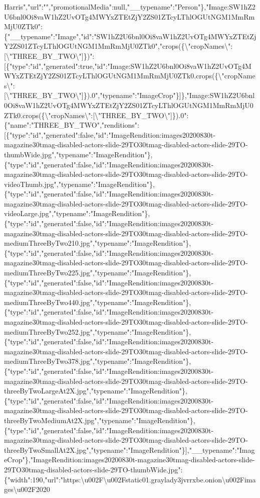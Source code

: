 Harris","url":"","promotionalMedia":null,"\_\_typename":"Person"\},"Image:SW1hZ2U6bnl0Oi8vaW1hZ2UvOTg4MWYxZTEtZjY2ZS01ZTcyLThlOGUtNGM1MmRmMjU0ZTk0":\{"\_\_typename":"Image","id":"SW1hZ2U6bnl0Oi8vaW1hZ2UvOTg4MWYxZTEtZjY2ZS01ZTcyLThlOGUtNGM1MmRmMjU0ZTk0","crops(\{\textbackslash{}"cropNames\textbackslash{}":{[}\textbackslash{}"THREE\_BY\_TWO\textbackslash{}"{]}\})":{[}\{"type":"id","generated":true,"id":"Image:SW1hZ2U6bnl0Oi8vaW1hZ2UvOTg4MWYxZTEtZjY2ZS01ZTcyLThlOGUtNGM1MmRmMjU0ZTk0.crops(\{\textbackslash{}"cropNames\textbackslash{}":{[}\textbackslash{}"THREE\_BY\_TWO\textbackslash{}"{]}\}).0","typename":"ImageCrop"\}{]}\},"Image:SW1hZ2U6bnl0Oi8vaW1hZ2UvOTg4MWYxZTEtZjY2ZS01ZTcyLThlOGUtNGM1MmRmMjU0ZTk0.crops(\{\textbackslash{}"cropNames\textbackslash{}":{[}\textbackslash{}"THREE\_BY\_TWO\textbackslash{}"{]}\}).0":\{"name":"THREE\_BY\_TWO","renditions":{[}\{"type":"id","generated":false,"id":"ImageRendition:images20200830t-magazine30tmag-disabled-actors-slide-29TO30tmag-disabled-actors-slide-29TO-thumbWide.jpg","typename":"ImageRendition"\},\{"type":"id","generated":false,"id":"ImageRendition:images20200830t-magazine30tmag-disabled-actors-slide-29TO30tmag-disabled-actors-slide-29TO-videoThumb.jpg","typename":"ImageRendition"\},\{"type":"id","generated":false,"id":"ImageRendition:images20200830t-magazine30tmag-disabled-actors-slide-29TO30tmag-disabled-actors-slide-29TO-videoLarge.jpg","typename":"ImageRendition"\},\{"type":"id","generated":false,"id":"ImageRendition:images20200830t-magazine30tmag-disabled-actors-slide-29TO30tmag-disabled-actors-slide-29TO-mediumThreeByTwo210.jpg","typename":"ImageRendition"\},\{"type":"id","generated":false,"id":"ImageRendition:images20200830t-magazine30tmag-disabled-actors-slide-29TO30tmag-disabled-actors-slide-29TO-mediumThreeByTwo225.jpg","typename":"ImageRendition"\},\{"type":"id","generated":false,"id":"ImageRendition:images20200830t-magazine30tmag-disabled-actors-slide-29TO30tmag-disabled-actors-slide-29TO-mediumThreeByTwo440.jpg","typename":"ImageRendition"\},\{"type":"id","generated":false,"id":"ImageRendition:images20200830t-magazine30tmag-disabled-actors-slide-29TO30tmag-disabled-actors-slide-29TO-mediumThreeByTwo252.jpg","typename":"ImageRendition"\},\{"type":"id","generated":false,"id":"ImageRendition:images20200830t-magazine30tmag-disabled-actors-slide-29TO30tmag-disabled-actors-slide-29TO-mediumThreeByTwo378.jpg","typename":"ImageRendition"\},\{"type":"id","generated":false,"id":"ImageRendition:images20200830t-magazine30tmag-disabled-actors-slide-29TO30tmag-disabled-actors-slide-29TO-threeByTwoLargeAt2X.jpg","typename":"ImageRendition"\},\{"type":"id","generated":false,"id":"ImageRendition:images20200830t-magazine30tmag-disabled-actors-slide-29TO30tmag-disabled-actors-slide-29TO-threeByTwoMediumAt2X.jpg","typename":"ImageRendition"\},\{"type":"id","generated":false,"id":"ImageRendition:images20200830t-magazine30tmag-disabled-actors-slide-29TO30tmag-disabled-actors-slide-29TO-threeByTwoSmallAt2X.jpg","typename":"ImageRendition"\}{]},"\_\_typename":"ImageCrop"\},"ImageRendition:images20200830t-magazine30tmag-disabled-actors-slide-29TO30tmag-disabled-actors-slide-29TO-thumbWide.jpg":\{"width":190,"url":"https:\textbackslash{}u002F\textbackslash{}u002Fstatic01.graylady3jvrrxbe.onion\textbackslash{}u002Fimages\textbackslash{}u002F2020\textb